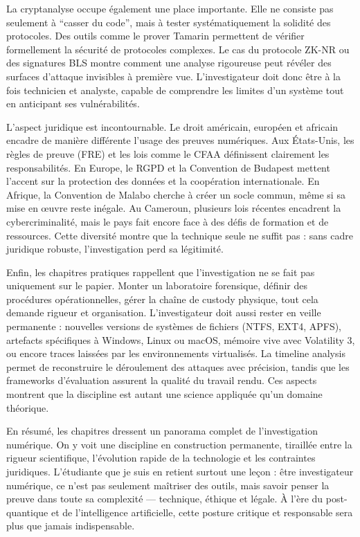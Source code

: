 \documentclass[12pt,a4paper]{report}
\begin{document}
	
	La cryptanalyse occupe également une place importante. Elle ne consiste pas seulement à “casser du code”, mais à tester systématiquement la solidité des protocoles. Des outils comme le prover Tamarin permettent de vérifier formellement la sécurité de protocoles complexes. Le cas du protocole ZK-NR ou des signatures BLS montre comment une analyse rigoureuse peut révéler des surfaces d’attaque invisibles à première vue. L’investigateur doit donc être à la fois technicien et analyste, capable de comprendre les limites d’un système tout en anticipant ses vulnérabilités.
	
	
	L’aspect juridique est incontournable. Le droit américain, européen et africain encadre de manière différente l’usage des preuves numériques. Aux États-Unis, les règles de preuve (FRE) et les lois comme le CFAA définissent clairement les responsabilités. En Europe, le RGPD et la Convention de Budapest mettent l’accent sur la protection des données et la coopération internationale. En Afrique, la Convention de Malabo cherche à créer un socle commun, même si sa mise en œuvre reste inégale. Au Cameroun, plusieurs lois récentes encadrent la cybercriminalité, mais le pays fait encore face à des défis de formation et de ressources. Cette diversité montre que la technique seule ne suffit pas : sans cadre juridique robuste, l’investigation perd sa légitimité.
	
	
	Enfin, les chapitres pratiques rappellent que l’investigation ne se fait pas uniquement sur le papier. Monter un laboratoire forensique, définir des procédures opérationnelles, gérer la chaîne de custody physique, tout cela demande rigueur et organisation. L’investigateur doit aussi rester en veille permanente : nouvelles versions de systèmes de fichiers (NTFS, EXT4, APFS), artefacts spécifiques à Windows, Linux ou macOS, mémoire vive avec Volatility 3, ou encore traces laissées par les environnements virtualisés. La timeline analysis permet de reconstruire le déroulement des attaques avec précision, tandis que les frameworks d’évaluation assurent la qualité du travail rendu. Ces aspects montrent que la discipline est autant une science appliquée qu’un domaine théorique.
	

	En résumé, les chapitres dressent un panorama complet de l’investigation numérique. On y voit une discipline en construction permanente, tiraillée entre la rigueur scientifique, l’évolution rapide de la technologie et les contraintes juridiques. L’étudiante que je suis en retient surtout une leçon : être investigateur numérique, ce n’est pas seulement maîtriser des outils, mais savoir penser la preuve dans toute sa complexité — technique, éthique et légale. À l’ère du post-quantique et de l’intelligence artificielle, cette posture critique et responsable sera plus que jamais indispensable.
	
\end{document}
